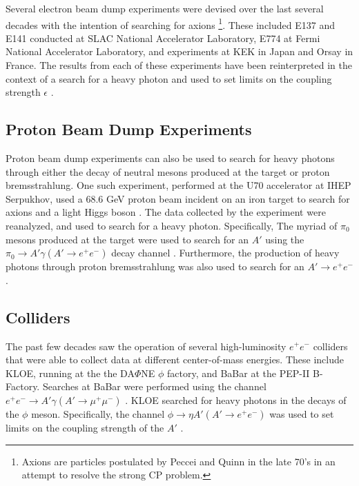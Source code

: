 
Several electron beam dump experiments were devised over the last several decades with
the intention of searching for axions \cite{Peccei:1977hh} \footnote{Axions are particles postulated 
by Peccei and Quinn in the late 70's in an attempt to resolve the strong CP problem.}.  These 
included E137 \cite{Bjorken:1988as}
and E141 \cite{riordan1987} conducted at SLAC National Accelerator Laboratory,
E774 \cite{bross1991} at Fermi National Accelerator Laboratory, and experiments at 
KEK \cite{konaka1986} in Japan and Orsay \cite{davier1989} in France. 
The results from each of these experiments have been reinterpreted in the 
context of a search for a heavy photon and used to set limits on the coupling
strength $\epsilon$ \cite{Bjorken:2009mm, andreas2012}.  

\subsection{Proton Beam Dump Experiments}

Proton beam dump experiments can also be used to search for heavy photons
through either the decay of neutral mesons produced at the target or proton
bremsstrahlung. One such experiment, performed at the U70 accelerator at IHEP
Serpukhov, used a 68.6 GeV proton beam incident on an iron target 
to search for axions
and a light Higgs boson \cite{Blumlein:1990ay, Blumlein:1991xh}.  The data
collected by the experiment were reanalyzed, and used to search for a heavy photon.
Specifically,
The myriad of $\pi_0$ mesons produced at the target were used to search for an 
$A'$ using the $\pi_0 \rightarrow A'\gamma (A' \rightarrow e^+e^-)$ 
decay channel \cite{Blumlein:2011mv}.  Furthermore, the production of heavy
photons through proton bremsstrahlung was also used to search for an 
$A' \rightarrow e^+e^-$ \cite{Blumlein:2013cua}.

\subsection{Colliders}

The past few decades saw the operation of several high-luminosity $e^+e^-$ colliders 
that were able to collect data at different center-of-mass energies.
These include KLOE, running at the the DA$\Phi$NE $\phi$ factory, and BaBar 
at the PEP-II B-Factory. Searches at BaBar were performed using the channel 
$e^+e^- \rightarrow A' \gamma (A' \rightarrow \mu^+\mu^-)$ 
\cite{Reece:2009un, Aubert:2009cp}.  KLOE 
searched for heavy photons in the decays of the $\phi$ meson.  Specifically, 
the channel $\phi \rightarrow \eta A' (A' \rightarrow e^+e^-)$ was used to
set limits on the coupling strength of the $A'$ 
\cite{Babusci:2012cr, Archilli:2011zc}.

